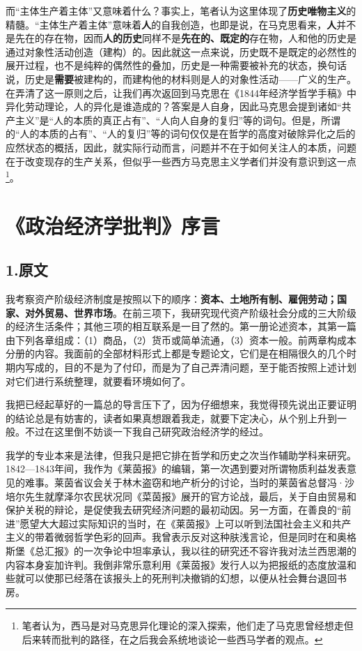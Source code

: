 \documentclass[a4paper,twoside,12pt]{ctexart}
\begin{document}
而“主体生产着主体”又意味着什么？事实上，笔者认为这里体现了\textbf{历史唯物主义}的精髓。“主体生产着主体”意味着\textbf{人}的自我创造，也即是说，在马克思看来，\textbf{人}并不是先在的存在物，因而\textbf{人的历史}同样不是\textbf{先在的、既定的}存在物，人和他的历史是通过对象性活动创造（建构）的。因此就这一点来说，历史既不是既定的必然性的展开过程，也不是纯粹的偶然性的叠加，历史是一种需要被补充的状态，换句话说，历史是\textbf{需要}被建构的，而建构他的材料则是人的对象性活动——广义的生产。在弄清了这一原则之后，让我们再次返回到马克思在《1844年经济学哲学手稿》中异化劳动理论，人的异化是谁造成的？答案是人自身，因此马克思会提到诸如“共产主义”是“人的本质的真正占有”、“人向人自身的复归”等的词句。但是，所谓的“人的本质的占有”、“人的复归”等的词句仅仅是在哲学的高度对破除异化之后的应然状态的概括，因此，就实际行动而言，问题并不在于如何关注人的本质，问题在于改变现存的生产关系，但似乎一些西方马克思主义学者们并没有意识到这一点\footnote{笔者认为，西马是对马克思异化理论的深入探索，他们走了马克思曾经想走但后来转而批判的路径，在之后我会系统地谈论一些西马学者的观点。}。

\newpage

\section{《政治经济学批判》序言}
\subsection{1.原文}
我考察资产阶级经济制度是按照以下的顺序：\textbf{资本、土地所有制、雇佣劳动；国家、对外贸易、世界市场}。在前三项下，我研究现代资产阶级社会分成的三大阶级的经济生活条件；其他三项的相互联系是一目了然的。第一册论述资本，其第一篇由下列各章组成：（1）商品，（2）货币或简单流通，（3）资本一般。前两章构成本分册的内容。我面前的全部材料形式上都是专题论文，它们是在相隔很久的几个时期内写成的，目的不是为了付印，而是为了自己弄清问题，至于能否按照上述计划对它们进行系统整理，就要看环境如何了。

我把已经起草好的一篇总的导言压下了，因为仔细想来，我觉得顸先说出正要证明的结论总是有妨害的，读者如果真想跟着我走，就要下定决心，从个别上升到一般。不过在这里倒不妨谈一下我自己研究政治经济学的经过。

我学的专业本来是法律，但我只是把它排在哲学和历史之次当作辅助学科来研究。1842—1843年间，我作为《莱茵报》的编辑，第一次遇到要对所谓物质利益发表意见的难事。莱茵省议会关于林木盗窃和地产析分的讨论，当时的莱茵省总督冯·沙培尔先生就摩泽尔农民状况同《菜茵报》展开的官方论战，最后，关于自由贸易和保护关税的辩论，是促使我去研究经济问题的最初动因。另一方面，在善良的“前进”愿望大大超过实际知识的当时，在《莱茵报》上可以听到法国社会主义和共产主义的带着微弱哲学色彩的回声。我曾表示反对这种肤浅言论，但是同时在和奥格斯堡《总汇报》的一次争论中坦率承认，我以往的研究还不容许我对法兰西思潮的内容本身妄加许判。我倒非常乐意利用《莱茵报》发行人以为把报纸的态度放温和些就可以使那已经落在该报头上的死刑判决撤销的幻想，以便从社会舞台退回书房。
\end{document}
